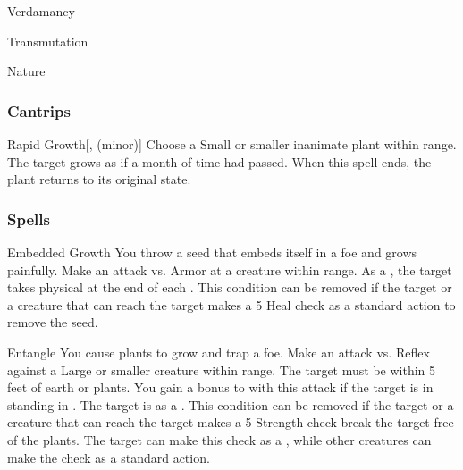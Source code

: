 \newpage
\begin{spellsection}{Verdamancy}

\begin{spellheader}
\end{spellheader}


 Transmutation

 Nature

\subsubsection{Cantrips}


\begin{apability}{Rapid Growth}[,  (minor)]
Choose a Small or smaller inanimate plant within \rngclose range.
The target grows as if a month of time had passed.
When this spell ends, the plant returns to its original state.
\end{apability}

\end{spellsection}


\subsubsection{Spells}


\lowercase{\hypertarget{spell:Embedded Growth}{}}\label{spell:Embedded Growth}
\begin{freeability}[\nth{1}]{\hypertarget{spell:Embedded Growth}{Embedded Growth}}
You throw a seed that embeds itself in a foe and grows painfully.
Make an attack vs. Armor at a creature within \rngclose range.
\hit As a , the target takes physical  at the end of each .
This condition can be removed if the target or a creature that can reach the target makes a  5 Heal check as a standard action to remove the seed.
\end{freeability}
\vspace{0.25em}



\lowercase{\hypertarget{spell:Entangle}{}}\label{spell:Entangle}
\begin{freeability}[\nth{1}]{\hypertarget{spell:Entangle}{Entangle}}
You cause plants to grow and trap a foe.
Make an attack vs. Reflex against a Large or smaller creature within \rngclose range.
The target must be within 5 feet of earth or plants.
You gain a  bonus to  with this attack if the target is in standing in .
\hit The target is  as a .
This condition can be removed if the target or a creature that can reach the target makes a  5 Strength check break the target free of the plants.
The target can make this check as a , while other creatures can make the check as a standard action.
\end{freeability}
\vspace{0.25em}



